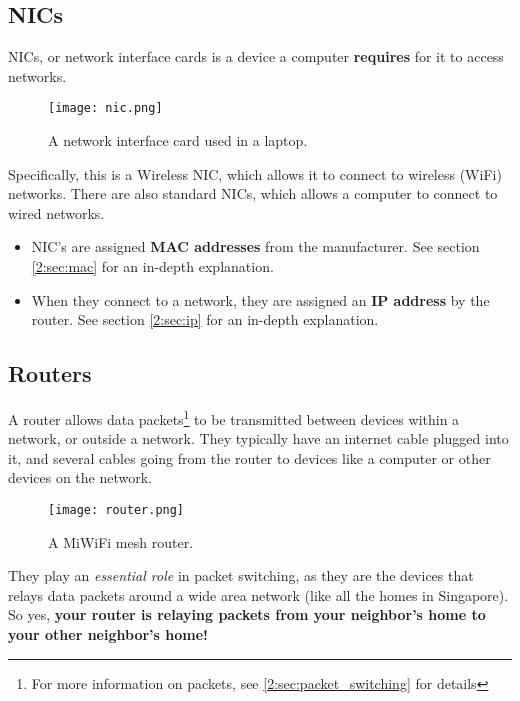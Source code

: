 \documentclass[../main.tex]{subfiles}
\begin{document}
\subsection{NICs}

NICs, or network interface cards is a device a computer \textbf{requires} for it to access networks.

\begin{figure}[H]
    \centering
    \texttt{[image: nic.png]}
    \caption{A network interface card used in a laptop.}
    \label{fig:nic}
\end{figure}

Specifically, this is a Wireless NIC, which allows it to connect to wireless (WiFi) networks. There are also standard NICs, which allows a computer to connect to wired networks.

\begin{itemize}
    \item NIC's are assigned \textbf{MAC addresses} from the manufacturer. See section \ref{2:sec:mac} for an in-depth explanation.
    \item When they connect to a network, they are assigned an \textbf{IP address} by the router. See section \ref{2:sec:ip} for an in-depth explanation.

\end{itemize}

\subsection{Routers}
\label{3:sec:routers}

A router allows data packets\footnote{For more information on packets, see \ref{2:sec:packet_switching} for details} to be transmitted between devices within a network, or outside a network. They typically have an internet cable plugged into it, and several cables going from the router to devices like a computer or other devices on the network.

\begin{figure}[H]
    \centering
    \texttt{[image: router.png]}
    \caption{A MiWiFi mesh router.}
    \label{fig:router}
\end{figure}

They play an \emph{essential role} in packet switching, as they are the devices that relays data packets around a wide area network (like all the homes in Singapore). So yes, \textbf{your router is relaying packets from your neighbor's home to your other neighbor's home!}
\end{document}
